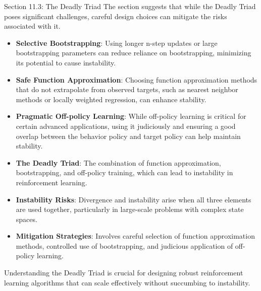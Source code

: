 \begin{notes}{Section 11.3: The Deadly Triad}
    The section suggests that while the Deadly Triad poses significant challenges, careful design choices can mitigate the risks associated with it.
    
    \begin{highlight}
    
        \begin{itemize}
            \item \textbf{Selective Bootstrapping}: Using longer n-step updates or large bootstrapping parameters can reduce reliance on bootstrapping, minimizing its potential to cause instability.
            \item \textbf{Safe Function Approximation}: Choosing function approximation methods that do not extrapolate from observed targets, such as nearest neighbor methods or locally weighted regression, 
            can enhance stability.
            \item \textbf{Pragmatic Off-policy Learning}: While off-policy learning is critical for certain advanced applications, using it judiciously and ensuring a good overlap between the behavior policy 
            and target policy can help maintain stability.
        \end{itemize}
    
    \end{highlight}
    
    \begin{highlight}
    
        \begin{itemize}
            \item \textbf{The Deadly Triad}: The combination of function approximation, bootstrapping, and off-policy training, which can lead to instability in reinforcement learning.
            \item \textbf{Instability Risks}: Divergence and instability arise when all three elements are used together, particularly in large-scale problems with complex state spaces.
            \item \textbf{Mitigation Strategies}: Involves careful selection of function approximation methods, controlled use of bootstrapping, and judicious application of off-policy learning.
        \end{itemize}
    
        Understanding the Deadly Triad is crucial for designing robust reinforcement learning algorithms that can scale effectively without succumbing to instability.
    
    \end{highlight}
\end{notes}

